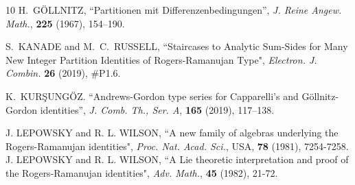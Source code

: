 \documentclass[12pt,a4paper]{amsart}
\theoremstyle{definition}
\theoremstyle{notation}
\theoremstyle{corollary}
\begin{document}
\begin{thebibliography}{10}
H.~G\"OLLNITZ, ``Partitionen mit Differenzenbedingungen'', \textit{J. Reine Angew. Math.}, \textbf{225} (1967), 154--190.

S.~KANADE and M.~C.~RUSSELL, ``Staircases to Analytic Sum-Sides for Many New Integer Partition Identities of Rogers-Ramanujan Type", \textit{Electron. J. Combin.} \textbf{26} (2019), \#P1.6.


K.~KUR\c{S}UNG\"OZ. ``Andrews-Gordon type series for Capparelli's and G\"ollnitz-Gordon identities'', \textit{J. Comb. Th., Ser. A}, \textbf{165} (2019), 117--138.

J. LEPOWSKY and R. L. WILSON, ``A new family of 
algebras underlying the Rogers-Ramanujan identities", 
\textit{Proc. Nat. Acad. Sci.}, USA, \textbf{78} (1981), 7254-7258. 
J. LEPOWSKY and R. L. WILSON, ``A Lie theoretic interpretation 
and proof of the Rogers-Ramanujan identities", {\it{Adv. Math.}}, 
{\bf{45}} (1982), 21-72. 
\end{thebibliography}
\end{document}
